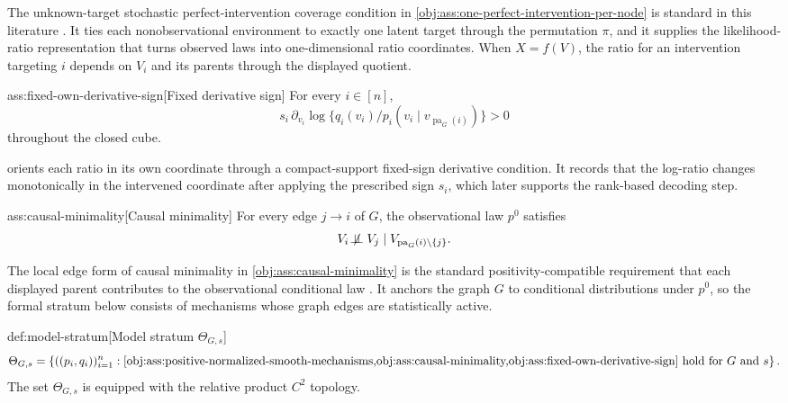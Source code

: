 \documentclass[11pt]{article}
\begin{document}
The unknown-target stochastic perfect-intervention coverage condition in \cref{obj:ass:one-perfect-intervention-per-node} is standard in this literature \citep{vonKugelgenEtAl2023UnknownInterventions}. It ties each nonobservational environment to exactly one latent target through the permutation \(\pi\), and it supplies the likelihood-ratio representation that turns observed laws into one-dimensional ratio coordinates. When \(X=f(V)\), the ratio for an intervention targeting \(i\) depends on \(V_i\) and its parents through the displayed quotient.

\begin{assumptionv}{ass:fixed-own-derivative-sign}[Fixed derivative sign]
For every \(i\in[n]\),
\[
s_i\,\partial_{v_i}\log\{q_i(v_i)/p_i(v_i\mid v_{\operatorname{pa}_G(i)})\}>0
\]
throughout the closed cube.
\end{assumptionv}

 orients each ratio in its own coordinate through a compact-support fixed-sign derivative condition. It records that the log-ratio changes monotonically in the intervened coordinate after applying the prescribed sign \(s_i\), which later supports the rank-based decoding step.

\begin{assumptionv}{ass:causal-minimality}[Causal minimality]
For every edge \(j\to i\) of \(G\), the observational law \(p^0\) satisfies
\[
V_i\not\!\perp\!\!\!\perp V_j
\mid
V_{\operatorname{pa}_G(i)\setminus\{j\}} .
\]
\end{assumptionv}

The local edge form of causal minimality in \cref{obj:ass:causal-minimality} is the standard positivity-compatible requirement that each displayed parent contributes to the observational conditional law \citep{SpirtesGlymourScheines2000}. It anchors the graph \(G\) to conditional distributions under \(p^0\), so the formal stratum below consists of mechanisms whose graph edges are statistically active.

\begin{definitionv}{def:model-stratum}[Model stratum \(\Theta_{G,s}\)]
\[
\Theta_{G,s}
=
\left\{
((p_i,q_i))_{i=1}^{n}:
\cref{obj:ass:positive-normalized-smooth-mechanisms,obj:ass:causal-minimality,obj:ass:fixed-own-derivative-sign}
\text{ hold for }G\text{ and }s
\right\}.
\]
The set \(\Theta_{G,s}\) is equipped with the relative product \(C^2\) topology.
\end{definitionv}
\end{document}
